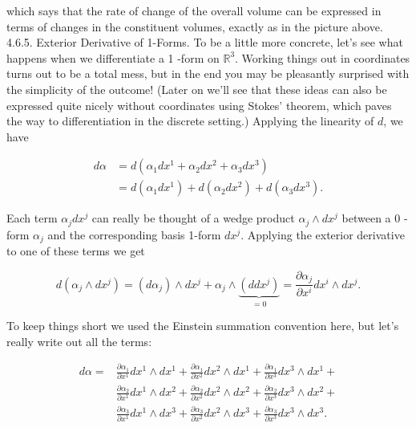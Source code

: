 \documentclass[10pt]{article}
\begin{document}
which says that the rate of change of the overall volume can be expressed in terms of changes in the constituent volumes, exactly as in the picture above.\\
4.6.5. Exterior Derivative of 1-Forms. To be a little more concrete, let's see what happens when we differentiate a 1 -form on $\mathbb{R}^{3}$. Working things out in coordinates turns out to be a total mess, but in the end you may be pleasantly surprised with the simplicity of the outcome! (Later on we'll see that these ideas can also be expressed quite nicely without coordinates using Stokes' theorem, which paves the way to differentiation in the discrete setting.) Applying the linearity of $d$, we have

$$
\begin{aligned}
d \alpha & =d\left(\alpha_{1} d x^{1}+\alpha_{2} d x^{2}+\alpha_{3} d x^{3}\right) \\
& =d\left(\alpha_{1} d x^{1}\right)+d\left(\alpha_{2} d x^{2}\right)+d\left(\alpha_{3} d x^{3}\right) .
\end{aligned}
$$

Each term $\alpha_{j} d x^{j}$ can really be thought of a wedge product $\alpha_{j} \wedge d x^{j}$ between a 0 -form $\alpha_{j}$ and the corresponding basis 1-form $d x^{j}$. Applying the exterior derivative to one of these terms we get

$$
d\left(\alpha_{j} \wedge d x^{j}\right)=\left(d \alpha_{j}\right) \wedge d x^{j}+\alpha_{j} \wedge \underbrace{\left(d d x^{j}\right)}_{=0}=\frac{\partial \alpha_{j}}{\partial x^{i}} d x^{i} \wedge d x^{j} .
$$

To keep things short we used the Einstein summation convention here, but let's really write out all the terms:

$$
\begin{aligned}
d \alpha= & \frac{\partial \alpha_{1}}{\partial x^{1}} d x^{1} \wedge d x^{1}+\frac{\partial \alpha_{1}}{\partial x^{2}} d x^{2} \wedge d x^{1}+\frac{\partial \alpha_{1}}{\partial x^{3}} d x^{3} \wedge d x^{1}+ \\
& \frac{\partial \alpha_{2}}{\partial x^{1}} d x^{1} \wedge d x^{2}+\frac{\partial \alpha_{2}}{\partial x^{2}} d x^{2} \wedge d x^{2}+\frac{\partial \alpha_{2}}{\partial x^{3}} d x^{3} \wedge d x^{2}+ \\
& \frac{\partial \alpha_{3}}{\partial x^{1}} d x^{1} \wedge d x^{3}+\frac{\partial \alpha_{3}}{\partial x^{2}} d x^{2} \wedge d x^{3}+\frac{\partial \alpha_{3}}{\partial x^{3}} d x^{3} \wedge d x^{3} .
\end{aligned}
$$
\end{document}
